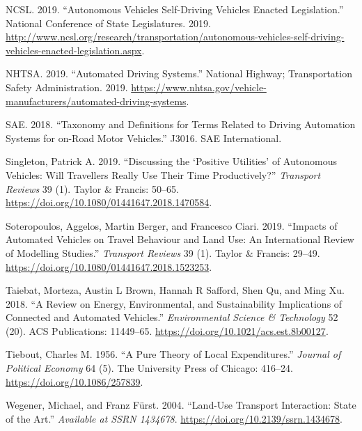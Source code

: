 \documentclass[12pt,]{article}
\begin{document}
\leavevmode\hypertarget{ref-NCSL2019AV}{}%
NCSL. 2019. ``Autonomous Vehicles \textbar{} Self-Driving Vehicles
Enacted Legislation.'' National Conference of State Legislatures. 2019.
\url{http://www.ncsl.org/research/transportation/autonomous-vehicles-self-driving-vehicles-enacted-legislation.aspx}.

\leavevmode\hypertarget{ref-NHTSA2019ADS}{}%
NHTSA. 2019. ``Automated Driving Systems.'' National Highway;
Transportation Safety Administration. 2019.
\url{https://www.nhtsa.gov/vehicle-manufacturers/automated-driving-systems}.

\leavevmode\hypertarget{ref-sae2018taxonomy}{}%
SAE. 2018. ``Taxonomy and Definitions for Terms Related to Driving
Automation Systems for on-Road Motor Vehicles.'' J3016. SAE
International.

\leavevmode\hypertarget{ref-singleton2019discussing}{}%
Singleton, Patrick A. 2019. ``Discussing the `Positive Utilities' of
Autonomous Vehicles: Will Travellers Really Use Their Time
Productively?'' \emph{Transport Reviews} 39 (1). Taylor \& Francis:
50--65. \url{https://doi.org/10.1080/01441647.2018.1470584}.

\leavevmode\hypertarget{ref-soteropoulos2019impacts}{}%
Soteropoulos, Aggelos, Martin Berger, and Francesco Ciari. 2019.
``Impacts of Automated Vehicles on Travel Behaviour and Land Use: An
International Review of Modelling Studies.'' \emph{Transport Reviews} 39
(1). Taylor \& Francis: 29--49.
\url{https://doi.org/10.1080/01441647.2018.1523253}.

\leavevmode\hypertarget{ref-taiebat2018review}{}%
Taiebat, Morteza, Austin L Brown, Hannah R Safford, Shen Qu, and Ming
Xu. 2018. ``A Review on Energy, Environmental, and Sustainability
Implications of Connected and Automated Vehicles.'' \emph{Environmental
Science \& Technology} 52 (20). ACS Publications: 11449--65.
\url{https://doi.org/10.1021/acs.est.8b00127}.

\leavevmode\hypertarget{ref-tiebout1956pure}{}%
Tiebout, Charles M. 1956. ``A Pure Theory of Local Expenditures.''
\emph{Journal of Political Economy} 64 (5). The University Press of
Chicago: 416--24. \url{https://doi.org/10.1086/257839}.

\leavevmode\hypertarget{ref-wegener2004land}{}%
Wegener, Michael, and Franz Fürst. 2004. ``Land-Use Transport
Interaction: State of the Art.'' \emph{Available at SSRN 1434678}.
\url{https://doi.org/10.2139/ssrn.1434678}.
\end{document}
